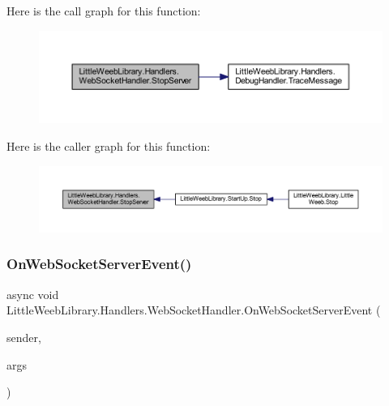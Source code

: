 Here is the call graph for this function\+:\nopagebreak
\begin{figure}[H]
\begin{center}
\leavevmode
\includegraphics[width=350pt]{class_little_weeb_library_1_1_handlers_1_1_web_socket_handler_abcd87ac26780369b500299fc12aa0039_cgraph}
\end{center}
\end{figure}
Here is the caller graph for this function\+:\nopagebreak
\begin{figure}[H]
\begin{center}
\leavevmode
\includegraphics[width=350pt]{class_little_weeb_library_1_1_handlers_1_1_web_socket_handler_abcd87ac26780369b500299fc12aa0039_icgraph}
\end{center}
\end{figure}
\mbox{\label{class_little_weeb_library_1_1_handlers_1_1_web_socket_handler_a527c7515f2e19938e9ff23ce2d993fda}} 
\subsubsection{\texorpdfstring{On\+Web\+Socket\+Server\+Event()}{OnWebSocketServerEvent()}}
{\footnotesize\ttfamily async void Little\+Weeb\+Library.\+Handlers.\+Web\+Socket\+Handler.\+On\+Web\+Socket\+Server\+Event (\begin{DoxyParamCaption}\item[{object}]{sender,  }\item[{Web\+Socket\+Event\+Arg}]{args }\end{DoxyParamCaption})\hspace{0.3cm}{\ttfamily [private]}}



